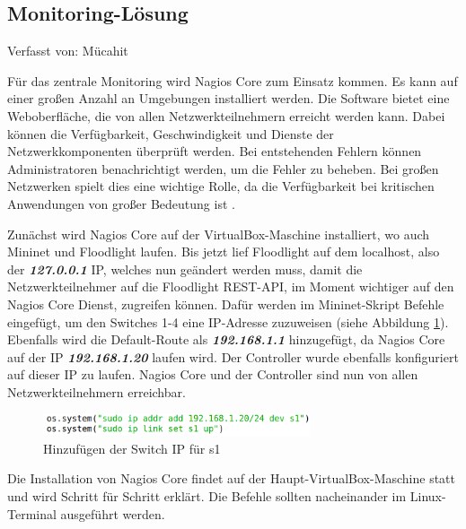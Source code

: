 \documentclass[fontsize=12pt,paper=a4,open=any,parskip=half,
  twoside=false,toc=listof,toc=bibliography,fleqn,leqno,
  captions=nooneline,captions=tableabove,british]{scrbook}
\begin{document}
\subsection{Monitoring-Lösung}
{\tiny Verfasst von: Mücahit\par}
Für das zentrale Monitoring wird Nagios Core zum Einsatz kommen. Es kann auf einer großen Anzahl an Umgebungen installiert werden. Die Software bietet eine Weboberfläche, die von allen Netzwerkteilnehmern erreicht werden kann. Dabei können die Verfügbarkeit, Geschwindigkeit und Dienste der Netzwerkkomponenten überprüft werden. Bei entstehenden Fehlern können Administratoren benachrichtigt werden, um die Fehler zu beheben. Bei großen Netzwerken spielt dies eine wichtige Rolle, da die Verfügbarkeit bei kritischen Anwendungen von großer Bedeutung ist \cite{nagiosdef}.\par
Zunächst wird Nagios Core auf der VirtualBox-Maschine installiert, wo auch Mininet und Floodlight laufen. Bis jetzt lief Floodlight auf dem localhost, also der \textit{\textbf{127.0.0.1}} IP, welches nun geändert werden muss, damit die Netzwerkteilnehmer auf die Floodlight REST-API, im Moment wichtiger auf den Nagios Core Dienst, zugreifen können. Dafür werden im Mininet-Skript Befehle eingefügt, um den Switches 1-4 eine IP-Adresse zuzuweisen (siehe Abbildung \ref{switch}). Ebenfalls wird die Default-Route als \textit{\textbf{192.168.1.1}} hinzugefügt, da Nagios Core auf der IP \textit{\textbf{192.168.1.20}} laufen wird. Der Controller wurde ebenfalls konfiguriert auf dieser IP zu laufen. Nagios Core und der Controller sind nun von allen Netzwerkteilnehmern erreichbar.

\begin{figure}[H]
 \centering
 \includegraphics[width=0.7\textwidth]{Bilder/switch}
 \captionsetup{justification=centering, margin=2cm}
 \caption{Hinzufügen der Switch IP für s1}
 \label{switch}
\end{figure}
 
Die Installation von Nagios Core findet auf der Haupt-VirtualBox-Maschine statt und wird Schritt für Schritt erklärt. Die Befehle sollten nacheinander im Linux-Terminal ausgeführt werden.

\newlength\myboxwidth

\setlength{\myboxwidth}{\dimexpr\textwidth-2\fboxsep}
\end{document}
